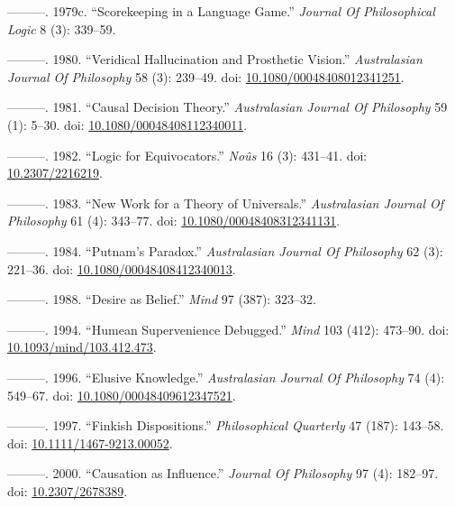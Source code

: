 \documentclass[
  10pt,
  letterpaper,
  DIV=11,
  numbers=noendperiod,
  twoside]{scrartcl}
\newlength{\cslhangindent}
\newenvironment{CSLReferences}[2] %
 {\begin{list}{}{%
  \setlength{\itemindent}{0pt}
  \setlength{\leftmargin}{0pt}
  \setlength{\parsep}{0pt}
  \ifodd #1
   \setlength{\leftmargin}{\cslhangindent}
   \setlength{\itemindent}{-1\cslhangindent}
  \fi
  \setlength{\itemsep}{#2\baselineskip}}}
 {\end{list}}
\begin{document}
\begin{CSLReferences}{1}{0}
---------. 1979c. {``Scorekeeping in a Language Game.''} \emph{Journal
Of Philosophical Logic} 8 (3): 339--59.

---------. 1980. {``Veridical Hallucination and Prosthetic Vision.''}
\emph{Australasian Journal Of Philosophy} 58 (3): 239--49. doi:
\href{https://doi.org/10.1080/00048408012341251}{10.1080/00048408012341251}.

---------. 1981. {``Causal Decision Theory.''} \emph{Australasian
Journal Of Philosophy} 59 (1): 5--30. doi:
\href{https://doi.org/10.1080/00048408112340011}{10.1080/00048408112340011}.

---------. 1982. {``Logic for Equivocators.''} \emph{Noûs} 16 (3):
431--41. doi: \href{https://doi.org/10.2307/2216219}{10.2307/2216219}.

---------. 1983. {``New Work for a Theory of Universals.''}
\emph{Australasian Journal Of Philosophy} 61 (4): 343--77. doi:
\href{https://doi.org/10.1080/00048408312341131}{10.1080/00048408312341131}.

---------. 1984. {``Putnam's Paradox.''} \emph{Australasian Journal Of
Philosophy} 62 (3): 221--36. doi:
\href{https://doi.org/10.1080/00048408412340013}{10.1080/00048408412340013}.

---------. 1988. {``Desire as Belief.''} \emph{Mind} 97 (387): 323--32.

---------. 1994. {``Humean Supervenience Debugged.''} \emph{Mind} 103
(412): 473--90. doi:
\href{https://doi.org/10.1093/mind/103.412.473}{10.1093/mind/103.412.473}.

---------. 1996. {``Elusive Knowledge.''} \emph{Australasian Journal Of
Philosophy} 74 (4): 549--67. doi:
\href{https://doi.org/10.1080/00048409612347521}{10.1080/00048409612347521}.

---------. 1997. {``Finkish Dispositions.''} \emph{Philosophical
Quarterly} 47 (187): 143--58. doi:
\href{https://doi.org/10.1111/1467-9213.00052}{10.1111/1467-9213.00052}.

---------. 2000. {``Causation as Influence.''} \emph{Journal Of
Philosophy} 97 (4): 182--97. doi:
\href{https://doi.org/10.2307/2678389}{10.2307/2678389}.


\end{CSLReferences}
\end{document}
